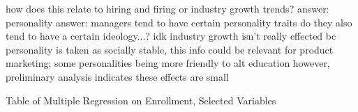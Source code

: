 \documentclass[review]{elsarticle}
\begin{document}


how does this relate to hiring and firing or industry growth trends?
answer: personality answer: managers tend to have certain personality traits
do they also tend to have a certain ideology...? idk
industry growth isn't really effected bc personality is taken as socially stable,
this info could be relevant for product marketing; some personalities being more friendly to alt education
however, preliminary analysis indicates these effects are small

%

\begin{table}
    \caption{Table of Multiple Regression on Enrollment, Selected Variables}
    \resizebox{\columnwidth}{!}{
        
    }
    \label{tab:table_new_ols}
\end{table}
\end{document}

